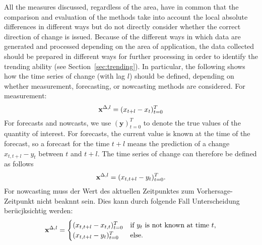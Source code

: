 All the measures discussed, regardless of the area, have in common that the comparison and evaluation of the methods take into account the local absolute differences in different ways but do not directly consider whether the correct direction of change is issued.
Because of the different ways in which data are generated and processed depending on the area of application, the data collected should be prepared in different ways for further processing in order to identify the trending ability (see Section~\ref{sec:trending}). 
In particular, the following shows how the time series of change (with lag $l$) should be defined, depending on whether measurement, forecasting, or nowcasting methods are considered. For measurement:
\begin{equation}
    \mathbf{x}^{\Delta,l} = (x_{t+l} -x_{t})^T_{t=0} \label{eq:diffxl_measure}
\end{equation}
For forecasts and nowcasts, we use $(\mathbf{y})^T_{t=0}$ to denote the true values of the quantity of interest. For forecasts, the current value is known at the time of the forecast, so a forecast for the time $t+l$ means the prediction of a change $x_{t,t+l} -y_{t}$ between $t$ and $t+l$. The time series of change can therefore be defined as follows 
\begin{equation}
    \mathbf{x}^{\Delta,l} = (x_{t,t+l} -y_{t})^T_{t=0}.\label{eq:diffxl_forecasting}
\end{equation}
For nowcasting muss der Wert des aktuellen Zeitpunktes zum Vorhersage-Zeitpunkt nicht beaknnt sein. Dies kann durch folgende Fall Unterscheidung berücjksichtig werden:
\begin{equation}
\mathbf{x}^{\Delta,l} = 
\begin{cases} 
(x_{t,t+l} -x_{t,t})^T_{t=0} & \text{if } y_{t} \text{ is not known at time } t, \\
(x_{t,t+l} -y_{t})^T_{t=0}  & \text{else}.
\end{cases} \label{eq:diffxl_nowcasting}
\end{equation}






